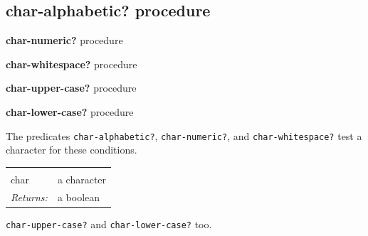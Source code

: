 \documentclass[twoside,9pt]{report}
\begin{document}
\subsection{char-alphabetic? procedure}
\label{char-alphabetic?-procedure}

\noindent \textbf{char-numeric?} procedure


\noindent \textbf{char-whitespace?} procedure


\noindent \textbf{char-upper-case?} procedure


\noindent \textbf{char-lower-case?} procedure



The predicates \texttt{char-alphabetic?}, \texttt{char-numeric?}, and \texttt{char-whitespace?} test a character for these conditions.

\noindent\begin{tabular}{ |p{1.9cm} p{8cm}| }
\hline
\rowcolor[HTML]{CCCCCC} \multicolumn{2}{|l|}{\bf char-alphabetic?, char-numeric?, char-whitespace? (public)} \\
char & a character \\
\textit{Returns:} & a boolean \\
\hline
\end{tabular}


\texttt{char-upper-case?} and \texttt{char-lower-case?} too.
\end{document}
